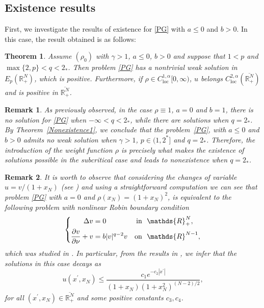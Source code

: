 \documentclass[12pt,reqno]{amsart}
\newtheorem{theorem}{Theorem}[section]
\newtheorem{remark}{Remark}[section]
\begin{document}
\subsection{Existence results}
 
First, we investigate the results of existence for \eqref{PG} with $a\leq 0$ and $b>0$. In this case, the result obtained is as follows:

\begin{theorem}\label{Problem1-Existence} Assume $(\rho_0)$ with $\gamma>1$, $a\leq0$, $b>0$ and suppose that $1<p$ and $\max\{2,p\}<q<2_\ast$. Then problem \eqref{PG} has a nontrivial weak solution in $E_p(\mathds{R}^N_+)$, which is positive. Furthermore, if $\rho \in C^{1,\alpha}_{\mathrm{loc}}[0,\infty)$, $u$ belongs $C^{2,\alpha}_{\mathrm{loc}}(\overline{\mathds{R}^N_+})$ and is positive in $\overline{\mathds{R}^N_+}$. 
\end{theorem} 

\begin{remark} \label{blue}
As previously observed, in the case $\rho \equiv 1$, $a=0$ and $b=1$, there is no solution for \eqref{PG} when $-\infty<q<2_\ast$, while there are solutions when $q=2_\ast$. By Theorem~\ref{Nonexistence1}, we conclude that the problem~\eqref{PG}, with $a\leq 0$ and $b>0$ admits no weak solution when $\gamma>1$, $p\in (1,2^\ast]$ and $q=2_\ast$. Therefore, the introduction of the weight function $\rho$ is precisely what makes the existence of solutions possible in the subcritical case and leads to nonexistence when $q=2_\ast$.
\end{remark}

\begin{remark}
It is worth to observe that considering the changes of variable 
 $
 u=v/{(1+x_N)} 
 $
(see \cite{Abreu-Furtado-Medeiros}) and using a straightforward computation we can see that problem \eqref{PG} with $a=0$ and $\rho(x_N)=(1+x_N)^2$,  is equivalent to the following problem with nonlinear Robin boundary condition
\begin{equation}\label{R2}
		\left\{
		\begin{aligned}
			\Delta v&=0 &\mbox{in }&\ \mathds{R}^N_+,
			\vspace{0.2cm}\\
			\frac{\partial v}{\partial \nu}+v&=b|v|^{q-2}v&\mbox{on }&\
			\mathds{R}^{N-1},
		\end{aligned}
		\right. 
	\end{equation}
which was studied in \cite{Abreu-JM-Medeiros}. In particular, from the results in \cite{Abreu-JM-Medeiros}, we infer that the solutions in this case decays as
$$
u(x^\prime,x_N)\leq \frac{c_1 e^{-c_2|x^\prime|}}{(1+x_N)(1+x_N^2)^{(N-2)/2}}, 
$$
for all $(x^\prime,x_N)\in \overline{\mathds{R}^N_+}$ and some positive constants $c_3,c_4$.
\end{remark}
\end{document}
